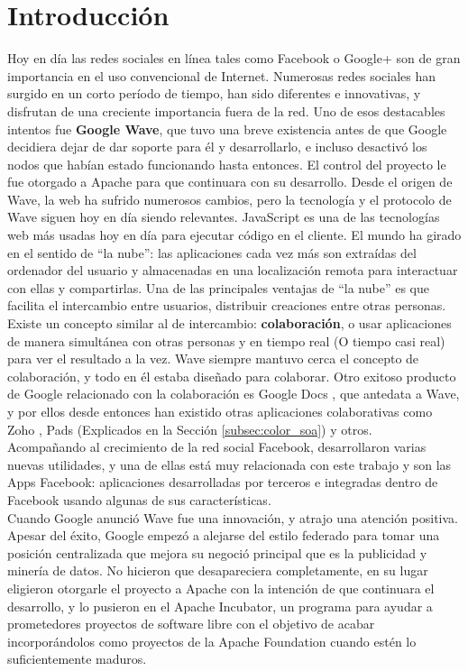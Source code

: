 \chapter{Introducción}
Hoy en día las redes sociales en línea tales como Facebook o Google+ son de gran importancia en el uso convencional de Internet. Numerosas redes sociales han surgido en un corto período de tiempo, han sido diferentes e innovativas, y disfrutan de una creciente importancia fuera de la red.
Uno de esos destacables intentos fue \textbf{Google Wave}, que tuvo una breve existencia antes de que Google decidiera dejar de dar soporte para él y desarrollarlo, e incluso desactivó los nodos que habían estado funcionando hasta entonces. El control del proyecto le fue otorgado a Apache para que continuara con su desarrollo. Desde el origen de Wave, la web ha sufrido numerosos cambios, pero la tecnología y el protocolo de Wave siguen hoy en día siendo relevantes. JavaScript es una de las tecnologías web más usadas hoy en día para ejecutar código en el cliente.
El mundo ha girado en el sentido de ``la nube'': las aplicaciones cada vez más son extraídas del ordenador del usuario y almacenadas en una localización remota para interactuar con ellas y compartirlas. Una de las principales ventajas de ``la nube'' es que facilita el intercambio entre usuarios, distribuir creaciones entre otras personas. Existe un concepto similar al de intercambio: \textbf{colaboración}, o usar aplicaciones de manera simultánea con otras personas y en tiempo real (O tiempo casi real) para ver el resultado a la vez. Wave siempre mantuvo cerca el concepto de colaboración, y todo en él estaba diseñado para colaborar. Otro exitoso producto de Google relacionado con la colaboración es Google Docs \cite{ref:google_docs}, que antedata a Wave, y por ellos desde entonces han existido otras aplicaciones colaborativas como Zoho \cite{ref:zoho}, Pads (Explicados en la Sección \ref{subsec:color_soa}) y otros.\\[.2cm]
Acompañando al crecimiento de la red social Facebook, desarrollaron varias nuevas utilidades, y una de ellas está muy relacionada con este trabajo y son las Apps Facebook: aplicaciones desarrolladas por terceros e integradas dentro de Facebook usando algunas de sus características.\\[.2cm]
Cuando Google anunció Wave fue una innovación, y atrajo una atención positiva. Apesar del éxito, Google empezó a alejarse del estilo federado para tomar una posición centralizada que mejora su negoció principal que es la publicidad y minería de datos. No hicieron que desapareciera completamente, en su lugar eligieron otorgarle el proyecto a Apache con la intención de que continuara el desarrollo, y lo pusieron en el Apache Incubator, un programa para ayudar a prometedores proyectos de software libre con el objetivo de acabar incorporándolos como proyectos de la Apache Foundation cuando estén lo suficientemente maduros.\\[.2cm]
